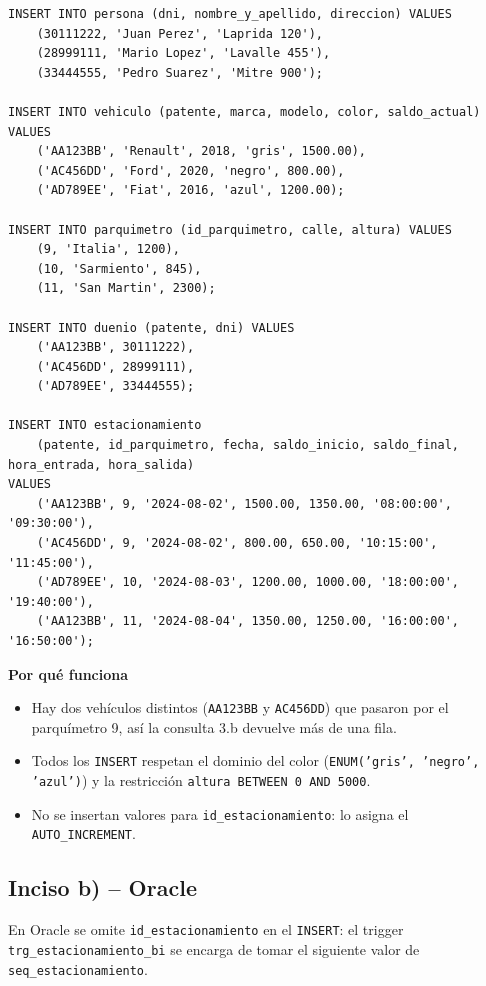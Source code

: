 \documentclass[11pt,a4paper]{article}
\newcommand{\itemcabecera}[1]{\noindent\textbf{#1}\par\medskip}
\newcommand{\bloquePorque}{\itemcabecera{Por qu\'e funciona}}
\begin{document}
\begin{lstlisting}
INSERT INTO persona (dni, nombre_y_apellido, direccion) VALUES
    (30111222, 'Juan Perez', 'Laprida 120'),
    (28999111, 'Mario Lopez', 'Lavalle 455'),
    (33444555, 'Pedro Suarez', 'Mitre 900');

INSERT INTO vehiculo (patente, marca, modelo, color, saldo_actual) VALUES
    ('AA123BB', 'Renault', 2018, 'gris', 1500.00),
    ('AC456DD', 'Ford', 2020, 'negro', 800.00),
    ('AD789EE', 'Fiat', 2016, 'azul', 1200.00);

INSERT INTO parquimetro (id_parquimetro, calle, altura) VALUES
    (9, 'Italia', 1200),
    (10, 'Sarmiento', 845),
    (11, 'San Martin', 2300);

INSERT INTO duenio (patente, dni) VALUES
    ('AA123BB', 30111222),
    ('AC456DD', 28999111),
    ('AD789EE', 33444555);

INSERT INTO estacionamiento
    (patente, id_parquimetro, fecha, saldo_inicio, saldo_final, hora_entrada, hora_salida)
VALUES
    ('AA123BB', 9, '2024-08-02', 1500.00, 1350.00, '08:00:00', '09:30:00'),
    ('AC456DD', 9, '2024-08-02', 800.00, 650.00, '10:15:00', '11:45:00'),
    ('AD789EE', 10, '2024-08-03', 1200.00, 1000.00, '18:00:00', '19:40:00'),
    ('AA123BB', 11, '2024-08-04', 1350.00, 1250.00, '16:00:00', '16:50:00');
\end{lstlisting}

\bloquePorque

\begin{itemize}
    \item Hay dos vehículos distintos (\texttt{AA123BB} y \texttt{AC456DD}) que pasaron por el parquímetro 9, así la consulta 3.b devuelve más de una fila.
    \item Todos los \texttt{INSERT} respetan el dominio del color (\texttt{ENUM('gris', 'negro', 'azul')}) y la restricción \texttt{altura BETWEEN 0 AND 5000}.
    \item No se insertan valores para \texttt{id\_estacionamiento}: lo asigna el \texttt{AUTO\_INCREMENT}.
\end{itemize}

\subsection{Inciso b) -- Oracle}

En Oracle se omite \texttt{id\_estacionamiento} en el \texttt{INSERT}: el trigger \texttt{trg\_estacionamiento\_bi} se encarga de tomar el siguiente valor de \texttt{seq\_estacionamiento}.
\end{document}
